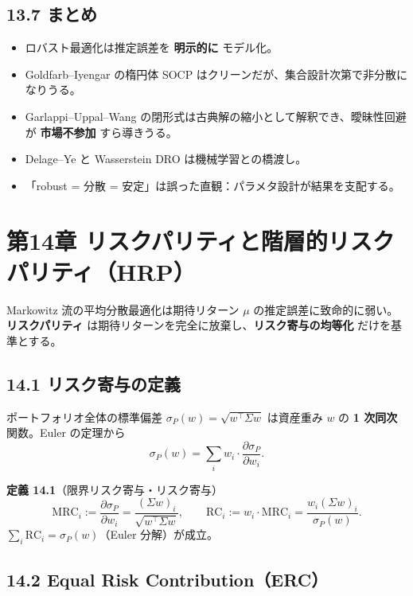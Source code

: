 \documentclass[11pt,a4paper]{report}
\begin{document}
\section{13.7 まとめ}

\begin{itemize}
\item ロバスト最適化は推定誤差を \textbf{明示的に} モデル化。
\item Goldfarb–Iyengar の楕円体 SOCP はクリーンだが、集合設計次第で非分散になりうる。
\item Garlappi–Uppal–Wang の閉形式は古典解の縮小として解釈でき、曖昧性回避が \textbf{市場不参加} すら導きうる。
\item Delage–Ye と Wasserstein DRO は機械学習との橋渡し。
\item 「robust = 分散 = 安定」は誤った直観：パラメタ設計が結果を支配する。
\end{itemize}

\noindent\hrulefill

\chapter{第14章 リスクパリティと階層的リスクパリティ（HRP）}

Markowitz 流の平均分散最適化は期待リターン $\mu$ の推定誤差に致命的に弱い。\textbf{リスクパリティ} は期待リターンを完全に放棄し、\textbf{リスク寄与の均等化} だけを基準とする。

\section{14.1 リスク寄与の定義}

ポートフォリオ全体の標準偏差 $\sigma_P(w) = \sqrt{w^\top \Sigma w}$ は資産重み $w$ の \textbf{1 次同次} 関数。Euler の定理から \[ \sigma_P(w) = \sum_i w_i \cdot \frac{\partial \sigma_P}{\partial w_i}. \]

\textbf{定義 14.1}（限界リスク寄与・リスク寄与） \[ \mathrm{MRC}_i := \frac{\partial \sigma_P}{\partial w_i} = \frac{(\Sigma w)_i}{\sqrt{w^\top \Sigma w}},\qquad \mathrm{RC}_i := w_i \cdot \mathrm{MRC}_i = \frac{w_i (\Sigma w)_i}{\sigma_P(w)}. \] $\sum_i \mathrm{RC}_i = \sigma_P(w)$（Euler 分解）が成立。

\section{14.2 Equal Risk Contribution（ERC）}
\end{document}
